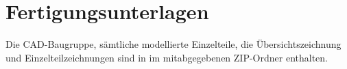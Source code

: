\section{Fertigungsunterlagen}

Die CAD-Baugruppe, sämtliche modellierte Einzelteile, die Übersichtszeichnung und Einzelteilzeichnungen sind in im mitabgegebenen ZIP-Ordner enthalten.